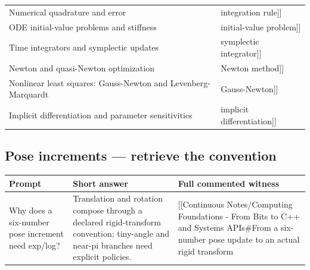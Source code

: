 {\begin{longtable}[]{@{}
  >{\raggedright\arraybackslash}p{}
  >{\raggedright\arraybackslash}p{}@{}}
{[}{[}Numerical quadrature and error & integration rule{]}{]} \\
{[}{[}ODE initial-value problems and stiffness & initial-value problem{]}{]} \\
{[}{[}Time integrators and symplectic updates & symplectic integrator{]}{]} \\
{[}{[}Newton and quasi-Newton optimization & Newton method{]}{]} \\
{[}{[}Nonlinear least squares: Gauss-Newton and Levenberg-Marquardt & Gauss-Newton{]}{]} \\
{[}{[}Implicit differentiation and parameter sensitivities & implicit differentiation{]}{]} \\
\end{longtable}
}

\subsection{Pose increments --- retrieve the convention}\label{appendix-adf48f5dc5c1-pose-increments-retrieve-the-convention}

{\def\LTcaptype{none} %
\begin{longtable}[]{@{}
  >{\raggedright\arraybackslash}p{}
  >{\raggedright\arraybackslash}p{}
  >{\raggedright\arraybackslash}p{}@{}}
\toprule\noalign{}
\begin{minipage}[b]{\linewidth}\raggedright
Prompt
\end{minipage} & \begin{minipage}[b]{\linewidth}\raggedright
Short answer
\end{minipage} & \begin{minipage}[b]{\linewidth}\raggedright
Full commented witness
\end{minipage} \\
\midrule\noalign{}
\endhead
\bottomrule\noalign{}
\endlastfoot
Why does a six-number pose increment need exp/log? & Translation and rotation compose through a declared rigid-transform convention; tiny-angle and near-pi branches need explicit policies. & {[}{[}Continuous Notes/Computing Foundations - From Bits to C++ and Systems APIs\#From a six-number pose update to an actual rigid transform \\
\end{longtable}
}
